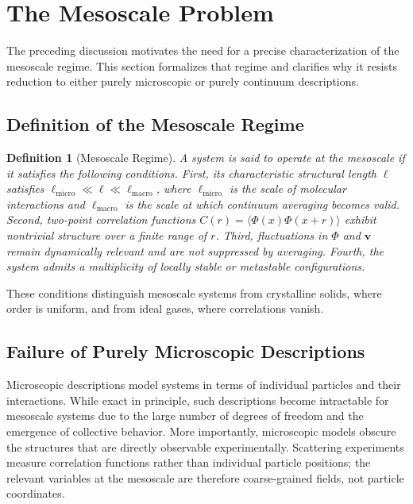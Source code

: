 \documentclass[11pt, a4paper, twocolumn]{article}
\newtheorem{definition}{Definition}[section]
\begin{document}
\section{The Mesoscale Problem}

The preceding discussion motivates the need for a precise characterization of
the mesoscale regime. This section formalizes that regime and clarifies why it
resists reduction to either purely microscopic or purely continuum descriptions.

\subsection{Definition of the Mesoscale Regime}

\begin{definition}[Mesoscale Regime]
A system is said to operate at the mesoscale if it satisfies the following
conditions. First, its characteristic structural length $\ell$ satisfies
$\ell_{\mathrm{micro}} \ll \ell \ll \ell_{\mathrm{macro}}$, where
$\ell_{\mathrm{micro}}$ is the scale of molecular interactions and
$\ell_{\mathrm{macro}}$ is the scale at which continuum averaging becomes valid.
Second, two-point correlation functions $C(r) = \langle \Phi(x)\Phi(x+r)\rangle$
exhibit nontrivial structure over a finite range of $r$. Third, fluctuations in
$\Phi$ and $\mathbf{v}$ remain dynamically relevant and are not suppressed by
averaging. Fourth, the system admits a multiplicity of locally stable or
metastable configurations.
\end{definition}

These conditions distinguish mesoscale systems from crystalline solids, where
order is uniform, and from ideal gases, where correlations vanish.

\subsection{Failure of Purely Microscopic Descriptions}

Microscopic descriptions model systems in terms of individual particles and
their interactions. While exact in principle, such descriptions become
intractable for mesoscale systems due to the large number of degrees of freedom
and the emergence of collective behavior. More importantly, microscopic models
obscure the structures that are directly observable experimentally. Scattering
experiments measure correlation functions rather than individual particle
positions; the relevant variables at the mesoscale are therefore coarse-grained
fields, not particle coordinates.
\end{document}
